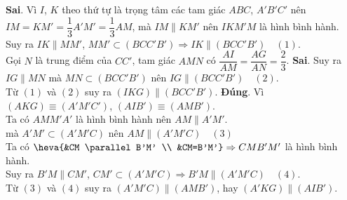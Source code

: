 \begin{ex}
{\begin{itemchoice}
   \itemch \textbf{Sai}. Vì $I$,  $K$ theo thứ tự là trọng tâm các tam giác $ABC$, $A'B'C'$ nên\\
   $IM=KM'=\dfrac{1}{3} A'M'=\dfrac{1}{3} AM$, mà $IM \parallel KM'$ nên $IKM'M$  là hình bình hành.\\
   Suy ra $IK \parallel  MM'$, $MM'\subset (BCC'B')\Rightarrow IK \parallel (BCC'B')\quad(1)$.\\
   Gọi $N$ là trung điểm của $CC'$,  tam giác $AMN$ có $\dfrac{AI}{AM}=\dfrac{AG}{AN}=\dfrac{2}{3}$.
   \itemch  \textbf{Sai}.
   Suy ra $IG \parallel MN$ mà $MN \subset  (BCC'B')$ nên $IG \parallel (BCC'B') \quad(2)$.\\
   Từ $(1)$ và $(2)$ suy ra  $(IKG)\parallel (BCC'B')$.
   \itemch \textbf{Đúng}.  Vì $(AKG) \equiv(A'M'C')$, $(AIB') \equiv(AMB')$.\\
   Ta có $AMM'A'$ là hình  bình hành nên $AM \parallel A'M'$.\\
   mà  $A'M' \subset (A'M'C)$ nên $AM \parallel (A'M'C)\quad(3)$\\
    Ta có $\heva{&CM \parallel B'M' \\ &CM=B'M'} \Rightarrow CMB'M'$ là hình bình hành.\\
    Suy ra $B'M \parallel CM'$, $CM' \subset(A'M'C) \Rightarrow B'M \parallel(A'M'C)\quad(4)$.\\
    Từ $(3)$ và $(4)$ suy ra $(A'M'C) \parallel(AMB')$, hay $(A'KG) \parallel(AIB')$.
  \end{itemchoice}
 } 
\end{ex}


